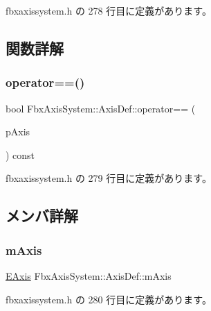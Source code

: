  fbxaxissystem.\+h の 278 行目に定義があります。



\subsection{関数詳解}
\mbox{\label{class_fbx_axis_system_1_1_axis_def_a97686e930af5f9528fbe2777f503f547}} 
\subsubsection{\texorpdfstring{operator==()}{operator==()}}
{\footnotesize\ttfamily bool Fbx\+Axis\+System\+::\+Axis\+Def\+::operator== (\begin{DoxyParamCaption}\item[{const \hyperlink{class_fbx_axis_system_1_1_axis_def}{Axis\+Def} \&}]{p\+Axis }\end{DoxyParamCaption}) const\hspace{0.3cm}{\ttfamily [inline]}}



 fbxaxissystem.\+h の 279 行目に定義があります。



\subsection{メンバ詳解}
\mbox{\label{class_fbx_axis_system_1_1_axis_def_a5e631800d928b1d20b545ceb94f7b6b2}} 
\subsubsection{\texorpdfstring{m\+Axis}{mAxis}}
{\footnotesize\ttfamily \hyperlink{class_fbx_axis_system_1_1_axis_def_acd082d83d7eff8dad168cf508d30eb54}{E\+Axis} Fbx\+Axis\+System\+::\+Axis\+Def\+::m\+Axis}



 fbxaxissystem.\+h の 280 行目に定義があります。


